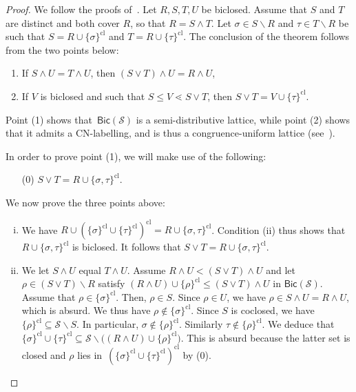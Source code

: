 \documentclass{amsart}
\theoremstyle{definition}
\newcommand{\cS}{\mathcal{S}} %
\newcommand{\ssm}{\smallsetminus} %
\newcommand{\closure}[1]{#1^{\mathrm{cl}}} %
\newcommand{\Bicl}[1]{\mathsf{Bic}(#1)} %
\begin{document}
\begin{proof}
We follow the proofs of~\cite[Thm.~5.2 \& Thm.~5.5]{McConville}. 
Let $R,S,T,U$ be biclosed.
Assume that $S$ and $T$ are distinct and both cover $R$, so that $R = S \wedge T$.
Let $\sigma \in S\ssm R$ and $\tau \in T \ssm R$ be such that $S = R \cup \closure{\{\sigma\}}$ and $T = R \cup \closure{\{\tau\}}$.
The conclusion of the theorem follows from the two points below:
\begin{enumerate}
 \item If $S \wedge U = T \wedge U$, then $(S\vee T) \wedge U = R \wedge U$,
 \item If $V$ is biclosed and such that $S \leq V \lessdot S \vee T$, then $S\vee T = V \cup \closure{\{\tau\}}$.
\end{enumerate}
Point (1) shows that~$\Bicl{\cS}$ is a semi-distributive lattice, while point (2) shows that it admits a CN-labelling, and is thus a congruence-uniform lattice (see~\cite[Thm.~4]{Reading-HyperplaneArrangement}).

In order to prove point (1), we will make use of the following:
\begin{itemize}
 \item[(0)] $S\vee T = R\cup\closure{\{\sigma,\tau\}}$.
\end{itemize}

We now prove the three points above:

\begin{enumerate}[(i)]
\item We have $R \cup \closure{(\closure{\{\sigma\}} \cup \closure{\{\tau\}} )} =   R \cup \closure{\{\sigma,\tau\}}$.
Condition (ii) thus shows that $R \cup \closure{\{\sigma,\tau\}}$ is biclosed.
It follows that $S\vee T = R \cup \closure{\{\sigma,\tau\}}$.

\item We let $S\wedge U$ equal $T\wedge U$. Assume $R\wedge U < (S\vee T)\wedge U$ and let $\rho \in (S\vee T) \ssm R$ satisfy $(R\wedge U) \cup \closure{\{\rho\}} \leq (S\vee T)\wedge U$ in $\Bicl{\cS}$.
Assume that $\rho\in\closure{\{\sigma\}}$.
Then, $\rho\in S$.
Since $\rho\in U$, we have ${\rho \in S \wedge U = R \wedge U}$, which is absurd.
We thus have $\rho \notin \closure{\{\sigma\}}$.
Since $S$ is coclosed, we have $\closure{\{\rho\}} \subseteq \cS\ssm S$.
In particular, $\sigma \notin \closure{\{\rho\}}$.
Similarly $\tau \notin \closure{\{\rho\}}$.
We deduce that ${\closure{\{\sigma\}} \cup \closure{\{\tau\}} \subseteq \cS\ssm \big( (R\wedge U) \cup \closure{\{\rho\}} \big)}$.
This is absurd because the latter set is closed and $\rho$ lies in~$\closure{( \closure{\{\sigma\}} \cup \closure{\{\tau\}} )}$ by (0).


\end{enumerate}
\end{proof}
\end{document}
